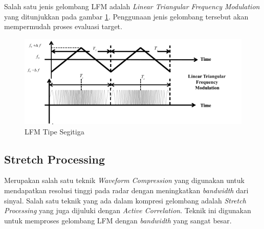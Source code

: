 Salah satu jenis gelombang LFM adalah \textit{Linear Triangular Frequency Modulation} yang ditunjukkan pada gambar \ref{pic:LFMTriangular}. Penggunaan jenis gelombang tersebut akan mempermudah proses evaluasi target.

\begin{figure}
	\begin{center}
		\includegraphics[scale=0.7]{pics/bab2/lfmTriangular.png}
		\caption[LFM Tipe Segitiga]{LFM Tipe Segitiga \cite{Jankiraman2018}}
		\label{pic:LFMTriangular}
	\end{center}
\end{figure}

\subsection{Stretch Processing}
Merupakan salah satu teknik \textit{Waveform Compression} yang digunakan untuk mendapatkan resolusi tinggi pada radar dengan meningkatkan \textit{bandwidth} dari sinyal. Salah satu teknik yang ada dalam kompresi gelombang adalah \textit{Stretch Processing} yang juga dijuluki dengan \textit{Active Correlation}. Teknik ini digunakan untuk memproses gelombang LFM dengan \textit{bandwidth} yang sangat besar.

